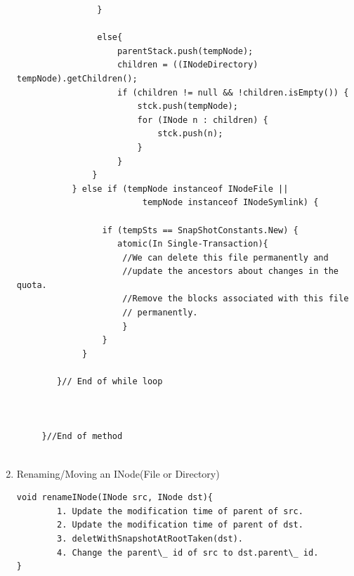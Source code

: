 \begin{enumerate}
\begin{verbatim}
                }
                
                else{
                    parentStack.push(tempNode);            
                    children = ((INodeDirectory) tempNode).getChildren();
                    if (children != null && !children.isEmpty()) {
                        stck.push(tempNode);
                        for (INode n : children) {
                            stck.push(n);
                        }
                    } 
               }
           } else if (tempNode instanceof INodeFile ||
                         tempNode instanceof INodeSymlink) {
                         
                 if (tempSts == SnapShotConstants.New) {
                    atomic(In Single-Transaction){
                     //We can delete this file permanently and 
                     //update the ancestors about changes in the quota.
                     //Remove the blocks associated with this file
                     // permanently.
                     }
                 }
             } 
             
        }// End of while loop
        
		      
        
     }//End of method      
            
\end{verbatim}


\item Renaming/Moving an INode(File or Directory)
\begin{verbatim}
void renameINode(INode src, INode dst){
        1. Update the modification time of parent of src.
        2. Update the modification time of parent of dst.
        3. deletWithSnapshotAtRootTaken(dst).
        4. Change the parent\_ id of src to dst.parent\_ id.
}
\end{verbatim}

\end{enumerate}



